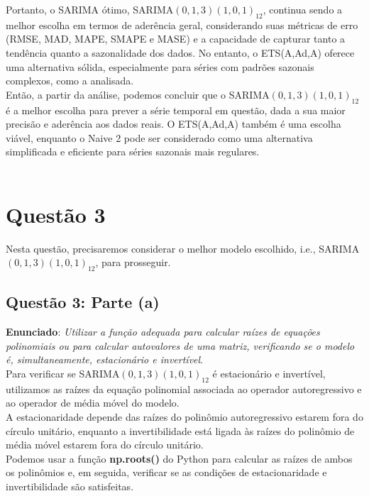 \documentclass[a4paper, 12pt]{article}
\begin{document}
Portanto, o SARIMA ótimo, SARIMA$(0,1,3)(1,0,1)_{12}$, continua sendo a melhor escolha em termos de aderência geral, considerando suas métricas de erro (RMSE, MAD, MAPE, SMAPE e MASE) e a capacidade de capturar tanto a tendência quanto a sazonalidade dos dados. No entanto, o ETS(A,Ad,A) oferece uma alternativa sólida, especialmente para séries com padrões sazonais complexos, como a analisada.\\

Então, a partir da análise, podemos concluir que o SARIMA$(0,1,3)(1,0,1)_{12}$ é a melhor escolha para prever a série temporal em questão, dada a sua maior precisão e aderência aos dados reais. O ETS(A,Ad,A) também é uma escolha viável, enquanto o Naive 2 pode ser considerado como uma alternativa simplificada e eficiente para séries sazonais mais regulares.\\\\




\section{Questão 3}

Nesta questão, precisaremos considerar o melhor modelo escolhido, i.e., SARIMA$(0,1,3)(1,0,1)_{12}$, para prosseguir.


\subsection{Questão 3: Parte (a)}
\textbf{Enunciado}: \textit{Utilizar a função adequada para calcular raízes de equações polinomiais ou para calcular autovalores de uma matriz, verificando se o modelo é, simultaneamente, estacionário e invertível}.\\

Para verificar se SARIMA$(0,1,3)(1,0,1)_{12}$ é estacionário e invertível, utilizamos as raízes da equação polinomial associada ao operador autoregressivo e ao operador de média móvel do modelo.\\

A estacionaridade depende das raízes do polinômio autoregressivo estarem fora do círculo unitário, enquanto a invertibilidade está ligada às raízes do polinômio de média móvel estarem fora do círculo unitário.\\

Podemos usar a função \textbf{np.roots()} do Python para calcular as raízes de ambos os polinômios e, em seguida, verificar se as condições de estacionaridade e invertibilidade são satisfeitas.\\
\end{document}
